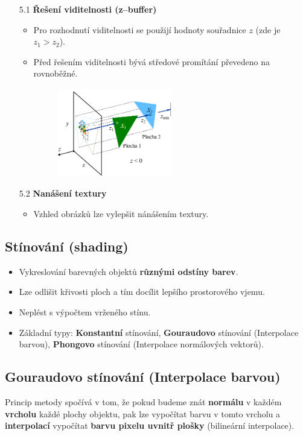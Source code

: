\begin{enumerate}
\begin{itemize}
\begin{figure}[H]
		\end{figure}
	\end{itemize}
	\item[5.1] \textbf{Řešení viditelnosti (z--buffer)}
	\begin{itemize}
		\item Pro rozhodnutí viditelnosti se použijí hodnoty souřadnice $z$ (zde je $z_1 > z_2$).
		\item Před řešením viditelnosti bývá středové promítání převedeno na rovnoběžné.
		\begin{figure}[H]
		\centering
		\includegraphics[width=0.5\textwidth]{assets/5_pip_zbuffer}
		\end{figure}
	\end{itemize}
	\item[5.2] \textbf{Nanášení textury}
	\begin{itemize}
		\item Vzhled obrázků lze vylepšit nánášením textury.
	\end{itemize}
\end{enumerate}

\subsection{Stínování (shading)}
\begin{itemize}
	\item Vykreslování barevných objektů \textbf{různými odstíny barev}.
	\item Lze odlišit křivosti ploch a tím docílit lepšího prostorového vjemu.
	\item Neplést s výpočtem vrženého stínu.
	\item Základní typy: \textbf{Konstantní} stínování, \textbf{Gouraudovo} stínování (Interpolace barvou), \textbf{Phongovo} stínování (Interpolace normálových vektorů).
\end{itemize}
\subsection{Gouraudovo stínování (Interpolace barvou)}
Princip metody spočívá v tom, že pokud budeme znát \textbf{normálu} v každém \textbf{vrcholu} každé plochy objektu, pak lze vypočítat barvu v tomto vrcholu a \textbf{interpolací} vypočítat \textbf{barvu pixelu uvnitř plošky} (bilineární interpolace).

